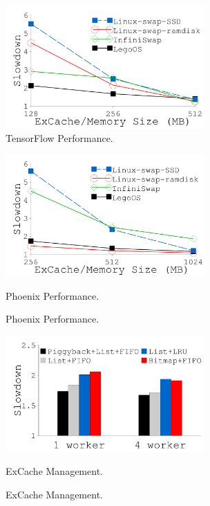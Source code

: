 {
\begin{figure}[h]
\begin{minipage}{3in}
\begin{center}
\centerline{\includegraphics[width=3in]{lego/Figures/g_plot_LEGO_tf4.pdf}}
\caption[TensorFlow Performance.]{TensorFlow Performance.}
\label{fig-tf4}
\end{center}
\end{minipage}
\end{figure}
}
{
\begin{figure}[h]
\begin{minipage}{3in}
\begin{center}
\centerline{\includegraphics[width=3in]{lego/Figures/g_plot_LEGO_phoenix.pdf}}
\caption{Phoenix Performance.}{Phoenix Performance.}
\label{fig-phoenix}
\end{center}
\end{minipage}
\end{figure}
}
{
\begin{figure}[h]
\begin{minipage}{3in}
\begin{center}
\centerline{\includegraphics[width=3in]{lego/Figures/g_plot_LEGO_excache_tech.pdf}}
\caption{ExCache Management.}{ExCache Management.}
\label{fig-excache-opt}
\end{center}
\end{minipage}
\end{figure}
}
